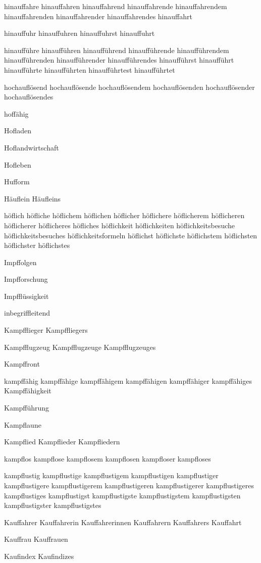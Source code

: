 hinauffahre hinauffahren hinauffahrend hinauffahrende hinauffahrendem hinauffahrenden hinauffahrender hinauffahrendes hinauffahrt

hinauffuhr hinauffuhren hinauffuhrst hinauffuhrt

hinaufführe hinaufführen hinaufführend hinaufführende hinaufführendem hinaufführenden hinaufführender hinaufführendes hinaufführst hinaufführt hinaufführte hinaufführten hinaufführtest hinaufführtet

hochauflösend hochauflösende hochauflösendem hochauflösenden hochauflösender hochauflösendes

hoffähig

Hofladen

Hoflandwirtschaft

Hofleben

Hufform

Häuflein Häufleins

höflich höfliche höflichem höflichen höflicher höflichere höflicherem höflicheren höflicherer höflicheres höfliches höflichkeit höflichkeiten höflichkeitsbesuche höflichkeitsbesuches höflichkeitsformeln höflichst höflichste höflichstem höflichsten höflichster höflichstes

Impffolgen

Impfforschung

Impfflüssigkeit

inbegriffleitend 

Kampfflieger Kampffliegers

Kampfflugzeug Kampfflugzeuge Kampfflugzeuges

Kampffront

kampffähig kampffähige kampffähigem kampffähigen kampffähiger kampffähiges Kampffähigkeit

Kampfführung

Kampflaune

Kampflied Kampflieder Kampfliedern

kampflos kampflose kampflosem kampflosen kampfloser kampfloses

kampflustig kampflustige kampflustigem kampflustigen kampflustiger kampflustigere kampflustigerem kampflustigeren kampflustigerer kampflustigeres kampflustiges kampflustigst kampflustigste kampflustigstem kampflustigsten kampflustigster kampflustigstes

Kauffahrer Kauffahrerin Kauffahrerinnen Kauffahrern Kauffahrers
Kauffahrt

Kauffrau Kauffrauen

Kaufindex Kaufindizes

